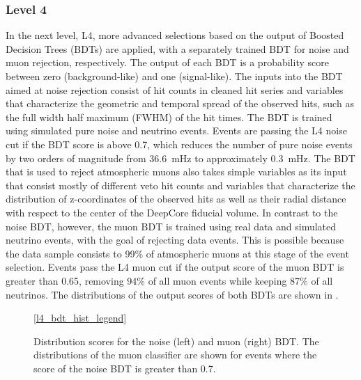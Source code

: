\subsubsection{Level 4}
\label{sec:level4-selection}
In the next level, L4, more advanced selections based on the output of Boosted Decision Trees (BDTs) are applied, with a separately trained BDT for noise and muon rejection, respectively. The output of each BDT is a probability score between zero (background-like) and one (signal-like).  The inputs into the BDT aimed at noise rejection consist of hit counts in cleaned hit series and variables that characterize the geometric and temporal spread of the observed hits, such as the full width half maximum (FWHM) of the hit times. The BDT is trained using simulated pure noise and neutrino events. Events are passing the L4 noise cut if the BDT score is above 0.7, which reduces the number of pure noise events by two orders of magnitude from 36.6~mHz to approximately 0.3~mHz. The BDT that is used to reject atmospheric muons also takes simple variables as its input that consist mostly of different veto hit counts and variables that characterize the distribution of z-coordinates of the observed hits as well as their radial distance with respect to the center of the DeepCore fiducial volume. In contrast to the noise BDT, however, the muon BDT is trained using real data and simulated neutrino events, with the goal of rejecting data events. This is possible because the data sample consists to 99\% of atmospheric muons at this stage of the event selection. Events pass the L4 muon cut if the output score of the muon BDT is greater than 0.65, removing 94\% of all muon events while keeping 87\% of all neutrinos. The distributions of the output scores of both BDTs are shown in .
\begin{figure}
    \centering
    \ref{l4_bdt_hist_legend}\hfill
    
    
    
    \caption{Distribution scores for the noise (left) and muon (right) BDT. The distributions of the muon classifier are shown for events where the score of the noise BDT is greater than 0.7.}
    \label{fig:l4-bdt-output}
\end{figure}

